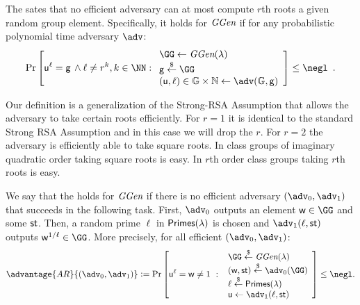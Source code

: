 \begin{assumption}


\label{assum:strongRSA}
The  sates that no efficient adversary can at most compute $r$th roots a given random group element. Specifically, it holds for $\textit{GGen}$ if for any probabilistic polynomial time adversary $\adv$:
\[
    \Pr\left[\gr{u}^\ell = \gr{g} \,\wedge \ell \neq r^k, k \in \NN:
    \begin{array}{l}
         \GG \leftarrow \ggen(\lambda)  \\
         \gr{g} \sample \GG \\
         (\gr{u}, \ell) \in \mathbb{G} \times \mathbb{N} \leftarrow \adv(\mathbb{G}, \gr{g}) \\
    \end{array}\right] \leq \negl \enspace .
\]
\end{assumption} 
Our definition is a generalization of the Strong-RSA Assumption that allows the adversary to take certain roots efficiently. For $r=1$ it is identical to the standard Strong RSA Assumption and in this case we will drop the $r$. For $r=2$ the adversary is efficiently able to take square roots. In class groups of imaginary quadratic order taking square roots is easy. In $r$th order class groups taking $r$th roots is easy.
\begin{assumption}
\label{assum:adaptiveroot}
We say that the  holds for $\textit{GGen}$ if 
there is no efficient adversary $(\adv_0,\adv_1)$ that succeeds 
in the following task.
First, $\adv_0$ outputs an element $\gr{w} \in \GG$ and some $\textsf{st}$.
Then, a random prime $\ell$ in $\textsf{Primes}(\lambda)$ is chosen
and $\adv_1(\ell,\state)$ outputs $\gr{w}^{1/\ell} \in \GG$.
More precisely, for all efficient $(\adv_0,\adv_1)$:
\[           \advantage{AR}{(\adv_0,\adv_1)}\deq 
                \Pr\left[\gr{u}^\ell = \gr{w} \neq 1 \ : \ 
                \begin{array}{l}
                      \GG \sample \ggen(\lambda) \\ 
                      (\gr{w},\state) \sample \adv_0(\GG) \\
                      \ell \sample \primes \\ 
                      \gr{u} \gets \adv_1(\ell, \state)
                \end{array} 
        \right] \leq \negl.
\]
\end{assumption}

